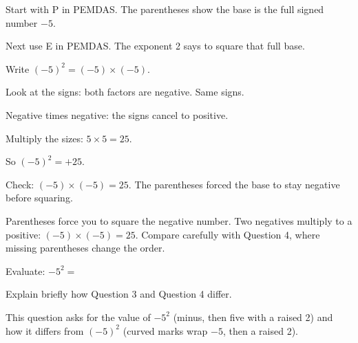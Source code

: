 \begin{steps}
  \item Start with P in PEMDAS. The parentheses show the base is the full signed number $-5$.
  \item Next use E in PEMDAS. The exponent 2 says to square that full base.
  \item Write $(-5)^{2} = (-5) \times (-5)$.
  \item Look at the signs: both factors are negative. Same signs.
  \item Negative times negative: the signs cancel to positive.
  \item Multiply the sizes: $5 \times 5 = 25$.
  \item So $(-5)^{2} = +25$.
  \item Check: $(-5) \times (-5) = 25$. The parentheses forced the base to stay negative before squaring.
\end{steps}


\noindent Parentheses force you to square the negative number. Two negatives multiply to a positive: $(-5) \times (-5) = 25$. Compare carefully with Question 4, where missing parentheses change the order.


\noindent Evaluate: $-5^{2} =$

\par\medskip\noindent Explain briefly how Question 3 and Question 4 differ.


\noindent This question asks for the value of $-5^{2}$ (minus, then five with a raised 2) and how it differs from $(-5)^{2}$ (curved marks wrap $-5$, then a raised 2).

